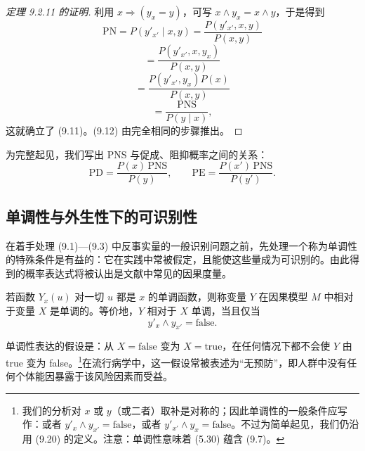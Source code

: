 \begin{proof}[定理 9.2.11 的证明]
利用 $x\Rightarrow(y_x=y)$，可写 $x\wedge y_x=x\wedge y$，于是得到
\begin{equation}
\mathrm{PN}=P(y'_{x'}\mid x,y)=\frac{P(y'_{x'},x,y)}{P(x,y)} \tag{9.15}
\end{equation}
\begin{equation}
=\frac{P(y'_{x'},x,y_x)}{P(x,y)} \tag{9.16}
\end{equation}
\begin{equation}
=\frac{P(y'_{x'},y_x)P(x)}{P(x,y)} \tag{9.17}
\end{equation}
\begin{equation}
=\frac{\mathrm{PNS}}{P(y\mid x)}, \tag{9.18}
\end{equation}
这就确立了 \textup{(9.11)}。\textup{(9.12)} 由完全相同的步骤推出。
\end{proof}

为完整起见，我们写出 PNS 与促成、阻抑概率之间的关系：
\begin{equation}
\mathrm{PD}=\frac{P(x)\,\mathrm{PNS}}{P(y)},\qquad \mathrm{PE}=\frac{P(x')\,\mathrm{PNS}}{P(y')}. \tag{9.19}
\end{equation}

\subsection{单调性与外生性下的可识别性}

在着手处理 \textup{(9.1)}—\textup{(9.3)} 中反事实量的一般识别问题之前，先处理一个称为单调性的特殊条件是有益的：它在实践中常被假定，且能使这些量成为可识别的。由此得到的概率表达式将被认出是文献中常见的因果度量。

\begin{definition}[单调性]
若函数 $Y_x(u)$ 对一切 $u$ 都是 $x$ 的单调函数，则称变量 $Y$ 在因果模型 $M$ 中相对于变量 $X$ 是单调的。等价地，$Y$ 相对于 $X$ 单调，当且仅当
\begin{equation}
y'_x\wedge y_{x'}=\text{false}. \tag{9.20}
\end{equation}
\end{definition}

单调性表达的假设是：从 $X=\text{false}$ 变为 $X=\text{true}$，在任何情况下都不会使 $Y$ 由 true 变为 false。\footnote{我们的分析对 $x$ 或 $y$（或二者）取补是对称的；因此单调性的一般条件应写作：或者 $y'_x\wedge y_{x'}=\text{false}$，或者 $y'_{x'}\wedge y_x=\text{false}$。不过为简单起见，我们仍沿用 \textup{(9.20)} 的定义。注意：单调性意味着 \textup{(5.30)} 蕴含 \textup{(9.7)}。}在流行病学中，这一假设常被表述为“无预防”，即人群中没有任何个体能因暴露于该风险因素而受益。

